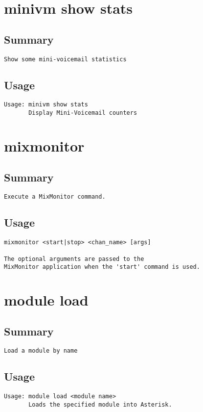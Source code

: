\section{minivm show stats}
\subsection{Summary}
\begin{verbatim}
Show some mini-voicemail statistics
\end{verbatim}
\subsection{Usage}
\begin{verbatim}
Usage: minivm show stats
       Display Mini-Voicemail counters

\end{verbatim}


\section{mixmonitor}
\subsection{Summary}
\begin{verbatim}
Execute a MixMonitor command.
\end{verbatim}
\subsection{Usage}
\begin{verbatim}
mixmonitor <start|stop> <chan_name> [args]

The optional arguments are passed to the
MixMonitor application when the 'start' command is used.

\end{verbatim}


\section{module load}
\subsection{Summary}
\begin{verbatim}
Load a module by name
\end{verbatim}
\subsection{Usage}
\begin{verbatim}
Usage: module load <module name>
       Loads the specified module into Asterisk.

\end{verbatim}


